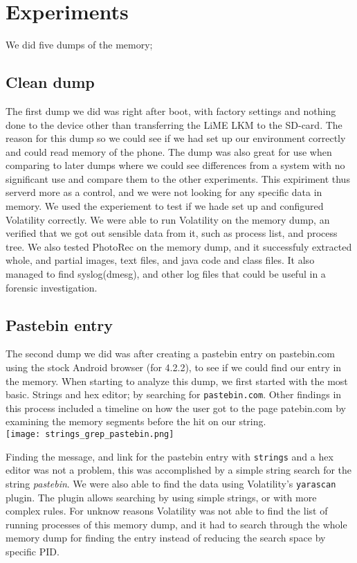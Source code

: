 \section{Experiments}
We did five dumps of the memory;
  \subsection{Clean dump}
The first dump we did was right after boot, with factory settings and nothing 
done to the device other than transferring the LiME LKM to the SD-card. The 
reason for this dump so we could see if we had set up our environment correctly 
and could read memory of the phone. The dump was also great for use when 
comparing to later dumps where we could see differences from a system with no 
significant use and compare them to the other experiments. This expiriment
thus serverd more as a control, and we were not looking for any specific data in
memory. We used the experiement to test if we hade set up and configured 
Volatility correctly. We were able to run Volatility on the memory dump, an 
verified that we got out sensible data from it, such as process list, and 
process tree. We also tested PhotoRec on the memory dump, and it successfuly
extracted whole, and partial images, text files, and java code and class files.
It also managed to find syslog(dmesg), and other log files that could be useful
in a forensic investigation.
  
\subsection{Pastebin entry}
The second dump we did was after creating a pastebin entry on pastebin.com using
the stock Android browser (for 4.2.2), to see if we could find our entry in the 
memory. When starting to analyze this dump, we first started with the most basic.
Strings and hex editor; by searching for \texttt{pastebin.com}. Other findings in
this process included a timeline on how the user got to the page patebin.com by 
examining the memory segments before the hit on our string.\\

\texttt{[image: strings\_grep\_pastebin.png]}


Finding the message, and link for the pastebin entry with \texttt{strings} and a
hex editor was not a problem, this was accomplished by a simple string search for
the string \textit{pastebin}. We were also able to find the data using Volatility's
\texttt{yarascan} plugin. The plugin allows searching by using simple strings,
or with more complex rules. For unknow reasons Volatility was not able to find
the list of running processes of this memory dump, and it had to search through 
the whole memory dump for finding the entry instead of reducing the search space 
by specific PID. 
  
